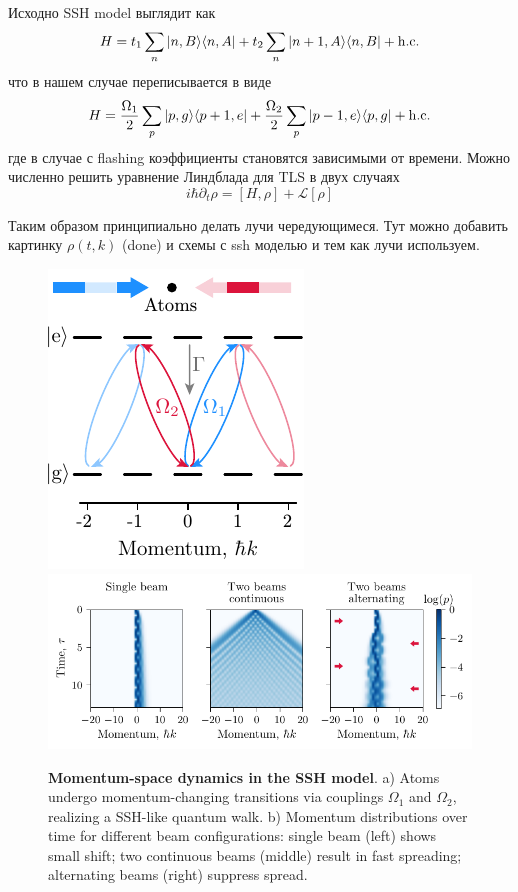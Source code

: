 Исходно SSH model выглядит как
\begin{equation*}
	H = t_1 \sum_n | n,B \rangle \langle n,A | + t_2 \sum_n | n+1, A \rangle \langle n, B | + \mathrm{h.c.}
\end{equation*}
что в нашем случае переписывается в виде
\begin{equation*}
	H = \frac{\Omega_1}{2} \sum_p | p,g \rangle \langle p+1,e | + \frac{\Omega_2}{2} \sum_p | p-1,e \rangle \langle p,g | + \mathrm{h.c.}
\end{equation*}
где в случае с flashing коэффициенты становятся зависимыми от времени. Можно численно решить уравнение Линдблада для TLS в двух случаях
\begin{equation*}
	i \hbar \partial_t \rho = [H, \rho] + \mathcal{L}[\rho]
\end{equation*}


Таким образом принципиально делать лучи чередующимеся. Тут можно добавить картинку $\rho(t, k)$ (done) и схемы с ssh моделью и тем как лучи используем. 






\begin{figure}
    \centering
    \includegraphics{fig-ai/ssh-scheme.pdf}
    \hfill
    \includegraphics{fig-py/ssh-model.pdf}
    \caption{
        \textbf{Momentum-space dynamics in the SSH model}. 
        a) Atoms undergo momentum-changing transitions via couplings $\Omega_1$ and $\Omega_2$, realizing a SSH-like quantum walk.
        b) Momentum distributions over time for different beam configurations: single beam (left) shows small shift; two continuous beams (middle) result in fast spreading; alternating beams (right) suppress spread.
    }
    \label{fig:sshmodel}
\end{figure}









